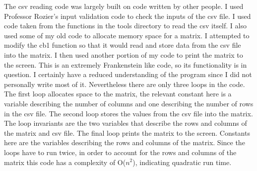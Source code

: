 \documentclass{article}
\begin{document}
The csv reading code was largely built on code written by other people. I used Professor Rozier's input validation code to check the inputs of the csv file. I used code taken from the functions in the tools directory to read the csv itself. I also used some of my old code to allocate memory space for a matrix. I attempted to modify the cb1 function so that it would read and store data from the csv file into the matrix. I then used another portion of my code to print the matrix to the screen. This is an extremely Frankenstein like code, so its functionality is in question. I certainly have a reduced understanding of the program since I did not personally write most of it. Nevertheless there are only three loops in the code. The first loop allocates space to the matrix, the relevant constant here is a variable describing the number of columns and one describing the number of rows in the csv file. The second loop stores the values from the csv file into the matrix. The loop invariants are the two variables that describe the rows and columns of the matrix and csv file. The final loop prints the matrix to the screen. Constants here are the variables describing the rows and columns of the matrix. Since the loops have to run twice, in order to account for the rows and columns of the matrix this code has a complexity of O($n^2$), indicating quadratic run time.
\end{document}
